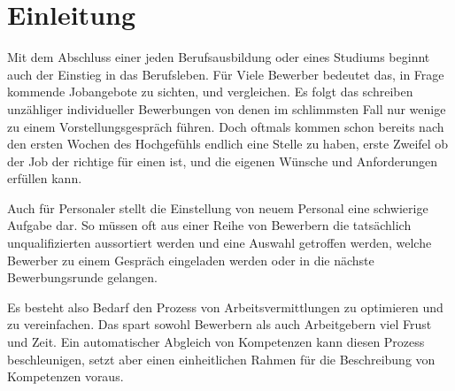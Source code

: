 \section{Einleitung}\label{1_einleitung}

Mit dem Abschluss einer jeden Berufsausbildung oder eines Studiums beginnt auch der Einstieg in das Berufsleben. Für Viele Bewerber bedeutet das, in Frage kommende Jobangebote zu sichten, und vergleichen. Es folgt das schreiben unzähliger individueller Bewerbungen von denen im schlimmsten Fall nur wenige zu einem Vorstellungsgespräch führen. Doch oftmals kommen schon bereits nach den ersten Wochen des Hochgefühls endlich eine Stelle zu haben, erste Zweifel ob der Job der richtige für einen ist, und die eigenen Wünsche und Anforderungen erfüllen kann.

Auch für Personaler stellt die Einstellung von neuem Personal eine schwierige Aufgabe dar. So müssen oft aus einer Reihe von Bewerbern die tatsächlich unqualifizierten aussortiert werden und eine Auswahl getroffen werden, welche Bewerber zu einem Gespräch eingeladen werden oder in die nächste Bewerbungsrunde gelangen.
 
Es besteht also Bedarf den Prozess von Arbeitsvermittlungen zu optimieren und zu vereinfachen. Das spart sowohl Bewerbern als auch Arbeitgebern viel Frust und Zeit. Ein automatischer Abgleich von Kompetenzen kann diesen Prozess beschleunigen, setzt aber einen einheitlichen Rahmen für die Beschreibung von Kompetenzen voraus. 
% 
%
%

